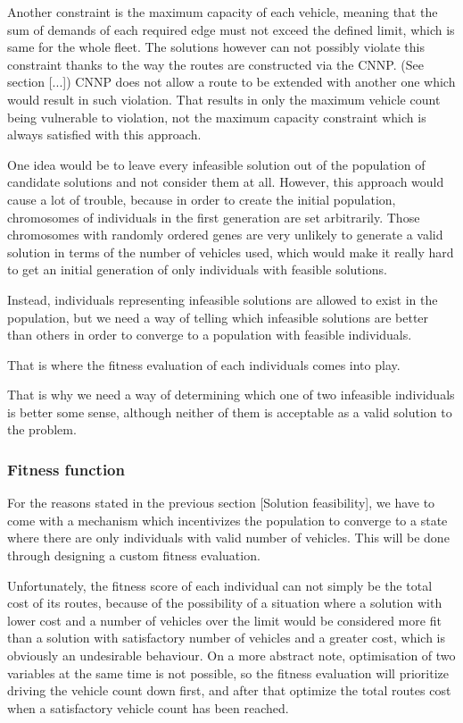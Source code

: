 \documentclass[twoside]{ctuthesis}
\theoremstyle{plain}
\theoremstyle{definition}
\theoremstyle{note}
\begin{document}
Another constraint is the maximum capacity of each vehicle, meaning that the sum of demands of each required edge must not exceed the defined limit, which is same for the whole fleet. The solutions however can not possibly violate this constraint thanks to the way the routes are constructed via the CNNP. (See section [...]) CNNP does not allow a route to be extended with another one which would result in such violation. That results in only the maximum vehicle count being vulnerable to violation, not the maximum capacity constraint which is always satisfied with this approach.

One idea would be to leave every infeasible solution out of the population of candidate solutions and not consider them at all. However, this approach would cause a lot of trouble, because in order to create the initial population, chromosomes of individuals in the first generation are set arbitrarily. Those chromosomes with randomly ordered genes are very unlikely to generate a valid solution in terms of the number of vehicles used, which would make it really hard to get an initial generation of only individuals with feasible solutions.

Instead, individuals representing infeasible solutions are allowed to exist in the population, but we need a way of telling which infeasible solutions are better than others in order to converge to a population with feasible individuals. 

That is where the fitness evaluation of each individuals comes into play.

That is why we need a way of determining which one of two infeasible individuals is better some sense, although neither of them is acceptable as a valid solution to the problem.

\subsubsection{Fitness function}
For the reasons stated in the previous section [Solution feasibility], we have to come with a mechanism which incentivizes the population to converge to a state where there are only individuals with valid number of vehicles. This will be done through designing a custom fitness evaluation.

Unfortunately, the fitness score of each individual can not simply be the total cost of its routes, because of the possibility of a situation where a solution with lower cost and a number of vehicles over the limit would be considered more fit than a solution with satisfactory number of vehicles and a greater cost, which is obviously an undesirable behaviour. On a more abstract note, optimisation of two variables at the same time is not possible, so the fitness evaluation will prioritize driving the vehicle count down first, and after that optimize the total routes cost when a satisfactory vehicle count has been reached.
\end{document}
